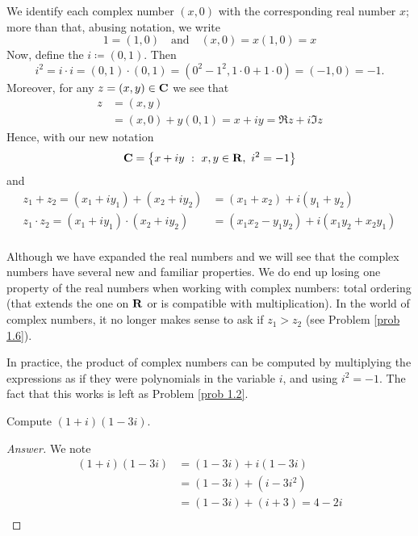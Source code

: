 \medskip

\begin{discussion}
We identify each complex number $(x,0)$ with the corresponding real number $x$; more than that, abusing notation, we write
\[1 = (1,0)\quad \text{and} \quad (x,0) = x(1,0) = x\]
Now, define the  $i \coloneqq (0,1)$. Then
\[i^2 = i\cdot i = (0,1)\cdot (0,1) = (0^2 - 1^2,1\cdot 0 + 1\cdot 0) = (-1,0) = -1.\]
Moreover, for any $z = (x,y) \in \mathbf C$ we see that
\begin{align*}
z &= (x,y)\\[0.5em]
&= (x,0) + y(0,1) = x + iy = \Re z + i\Im z
\end{align*}
Hence, with our new notation
\[\mathbf C = \left\{x+iy\ :\ x,y\in \mathbf R,\ i^2 = -1\right\}\]
and
\begin{align*}
z_1 + z_2 = (x_1 + iy_1) + (x_2 + iy_2) &= (x_1 + x_2) + i(y_1 + y_2)\\[0.5em]
z_1 \cdot z_2 = (x_1 + iy_1) \cdot (x_2 + iy_2) &= (x_1x_2 - y_1y_2) + i(x_1y_2 + x_2y_1)
\end{align*}\\
Although we have expanded the real numbers and we will see that the complex numbers have several new and familiar properties. We do end up losing one property of the real numbers when working with complex numbers: total ordering (that extends the one on $\mathbf R$ or is compatible with multiplication). In the world of complex numbers, it no longer makes sense to ask if $z_1 > z_2$ (see Problem \ref{prob 1.6}).
\end{discussion}

\medskip

In practice, the product of complex numbers can be computed by multiplying the expressions as if they were polynomials in the variable $i$, and using $i^2 = -1$. The fact that this works is left as Problem \ref{prob 1.2}.
\begin{example}
Compute $(1+i)(1-3i)$.
\end{example}
\begin{proof}[Answer]
We note
\begin{align*}
(1 + i)(1 - 3i) &= (1 - 3i) + i(1 - 3i)\\[0.5em]
&= (1 - 3i) + (i - 3i^2)\\[0.5em]
&= (1 - 3i) + (i + 3) = 4 - 2i\\[-2.5em]
\end{align*}
\end{proof}

\medskip

